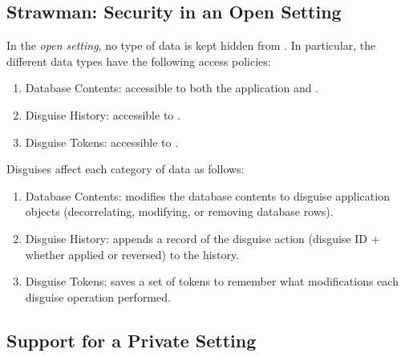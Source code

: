 \subsection{Strawman: Security in an Open Setting}
In the \emph{open setting}, no type of data is kept hidden from \sys. In particular, the different data
types have the following access policies:
\begin{enumerate}
    \item Database Contents: accessible to both the application and \sys.
    \item Disguise History: accessible to \sys.
    \item Disguise Tokens: accessible to \sys.
\end{enumerate}

Disguises affect each category of data as follows:
\begin{enumerate}
    \item Database Contents: \sys modifies the database contents to disguise 
        application objects (decorrelating, modifying, or removing database rows).
    \item Disguise History: \sys appends a record of the disguise action (disguise ID + whether
        applied or reversed) to the history.
    \item Disguise Tokens: \sys saves a set of tokens to remember what modifications each disguise
        operation performed. 
\end{enumerate}

\subsection{Support for a Private Setting}

